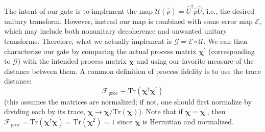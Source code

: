 The intent of our gate is to implement the map $\mathcal{U}(\hat{\rho}) = \hat{U}^\dag \hat{\rho} \hat{U}$, i.e., the desired unitary transform. However, instead our map is combined with some error map $\mathcal{E}$, which may include both nonunitary decoherence and unwanted unitary transforms. Therefore, what we actually implement is $\mathcal{G} = \mathcal{E} \circ\mathcal{U}$. We can then characterize our gate by comparing the actual process matrix $\bm{\chi^\prime}$ (corresponding to $\mathcal{G}$) with the intended process matrix $\bm{\chi}$ and using our favorite measure of the distance between them. A common definition of process fidelity is to use the trace distance:
\begin{equation}
    \mathcal{F}_\mathrm{proc} \equiv \mathrm{Tr}(\bm{\chi}^\dag \bm{\chi^\prime})
\end{equation}
(this assumes the matrices are normalized; if not, one should first normalize by dividing each by its trace, $\bm{\chi}\rightarrow\bm{\chi}/\mathrm{Tr}(\bm{\chi})$). Note that if $\bm{\chi} = \bm{\chi^\prime}$, then  $\mathcal{F}_\mathrm{proc} = \mathrm{Tr}(\bm{\chi}^\dag \bm{\chi}) = \mathrm{Tr}(\bm{\chi}^2) = 1$ since $\bm{\chi}$ is Hermitian and normalized.


